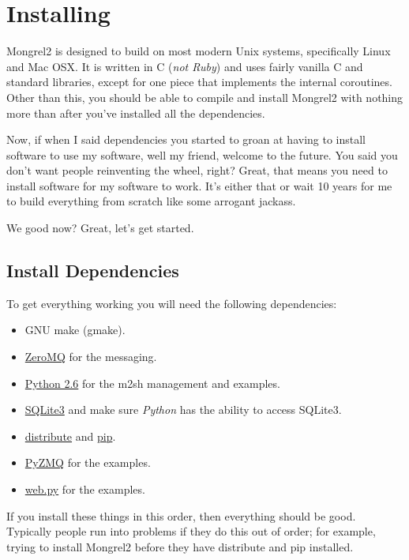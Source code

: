 \chapter{Installing}

Mongrel2 is designed to build on most modern Unix systems, specifically Linux
and Mac OSX.  It is written in C (\emph{not Ruby}) and uses fairly vanilla
C and standard libraries, except for one piece that implements the internal
coroutines.  Other than this, you should be able to compile and install Mongrel2
with nothing more than  after you've installed
all the dependencies.

Now, if when I said dependencies you started to groan at having to install
software to use my software, well my friend, welcome to the future.  You
said you don't want people reinventing the wheel, right?  Great, that means
you need to install software for my software to work.  It's either that or
wait 10 years for me to build everything from scratch like some arrogant
jackass.

We good now?  Great, let's get started.

\section{Install Dependencies}

To get everything working you will need the following dependencies:

\begin{itemize}
\item GNU make (gmake).
\item \href{http://zeromq.org}{ZeroMQ} for the messaging.
\item \href{http://python.org}{Python 2.6} for the m2sh management and examples.
\item \href{http://www.sqlite.org/}{SQLite3} and make sure \emph{Python} has the ability to access SQLite3.
\item \href{http://pypi.python.org/pypi/distribute}{distribute} and \href{http://pypi.python.org/pypi/pip/0.7.2}{pip}.
\item \href{http://github.com/zeromq/pyzmq}{PyZMQ} for the examples.
\item \href{http://webpy.org/}{web.py} for the examples.
\end{itemize}

If you install these things in this order, then everything should be good.
Typically people run into problems if they do this out of order; for example,
trying to install Mongrel2 before they have distribute and pip installed.


